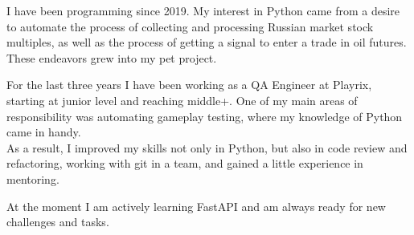 \documentclass[a4paper, 12pt]{article}
\begin{document}
\setlength\parindent{.3in}

I have been programming since 2019. My interest in Python came from a desire to automate the process of collecting and processing Russian market stock multiples, as well as the process of getting a signal to enter a trade in oil futures. These endeavors grew into my pet project.

For the last three years I have been working as a QA Engineer at Playrix, starting at junior level and reaching middle+. One of my main areas of responsibility was automating gameplay testing, where my knowledge of Python came in handy.
\\
As a result, I improved my skills not only in Python, but also in code review and refactoring, working with git in a team, and gained a little experience in mentoring.

At the moment I am actively learning FastAPI and am always ready for new challenges and tasks.
\end{document}

